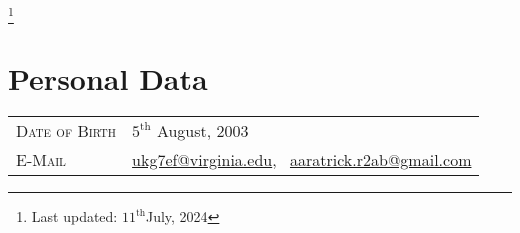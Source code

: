 \documentclass[a4paper, oneside, final]{scrartcl} %
\begin{document}


\begin{center}

  {\fontsize{32}{32}\selectfont\scshape{}} %
  \vspace{0.25 cm}

  {\fontsize{20}{20}\selectfont\scshape{}}\footnote{Last updated: \( {11}^{\text{th}} \)July, 2024}
  \vspace{0.5 cm} %




  \section{Personal Data}

  \begin{tabularx}{0.97\linewidth}{>{\raggedleft\scshape}p{4cm}X}
    Date of Birth & \( {5}^{\text{th}} \) August, 2003                                                                                          \\
    E-Mail        & \href{mailto:ukg7ef@virginia.edu}{ukg7ef@virginia.edu}, \, \href{mailto:aaratrick.r2ab@gmail.com}{aaratrick.r2ab@gmail.com} \\
  \end{tabularx}


\end{center}
\end{document}
